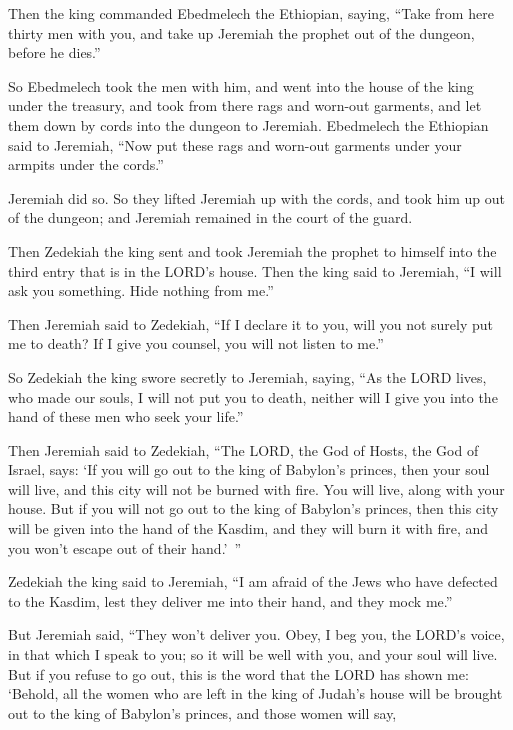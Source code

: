 \myverse{}Then the king commanded Ebedmelech the Ethiopian, saying, “Take from here thirty men with you, and take up Jeremiah the prophet out of the dungeon, before he dies.”


\myverse{}So Ebedmelech took the men with him, and went into the house of the king under the treasury, and took from there rags and worn-out garments, and let them down by cords into the dungeon to Jeremiah. \myverse{}Ebedmelech the Ethiopian said to Jeremiah, “Now put these rags and worn-out garments under your armpits under the cords.”

Jeremiah did so. \myverse{}So they lifted Jeremiah up with the cords, and took him up out of the dungeon; and Jeremiah remained in the court of the guard.


\myverse{}Then Zedekiah the king sent and took Jeremiah the prophet to himself into the third entry that is in the LORD’s house. Then the king said to Jeremiah, “I will ask you something. Hide nothing from me.”


\myverse{}Then Jeremiah said to Zedekiah, “If I declare it to you, will you not surely put me to death? If I give you counsel, you will not listen to me.”


\myverse{}So Zedekiah the king swore secretly to Jeremiah, saying, “As the LORD lives, who made our souls, I will not put you to death, neither will I give you into the hand of these men who seek your life.”


\myverse{}Then Jeremiah said to Zedekiah, “The LORD, the God of Hosts, the God of Israel, says: ‘If you will go out to the king of Babylon’s princes, then your soul will live, and this city will not be burned with fire. You will live, along with your house. \myverse{}But if you will not go out to the king of Babylon’s princes, then this city will be given into the hand of the Kasdim, and they will burn it with fire, and you won’t escape out of their hand.’ ”


\myverse{}Zedekiah the king said to Jeremiah, “I am afraid of the Jews who have defected to the Kasdim, lest they deliver me into their hand, and they mock me.”


\myverse{}But Jeremiah said, “They won’t deliver you. Obey, I beg you, the LORD’s voice, in that which I speak to you; so it will be well with you, and your soul will live. \myverse{}But if you refuse to go out, this is the word that the LORD has shown me: \myverse{}‘Behold, all the women who are left in the king of Judah’s house will be brought out to the king of Babylon’s princes, and those women will say,

